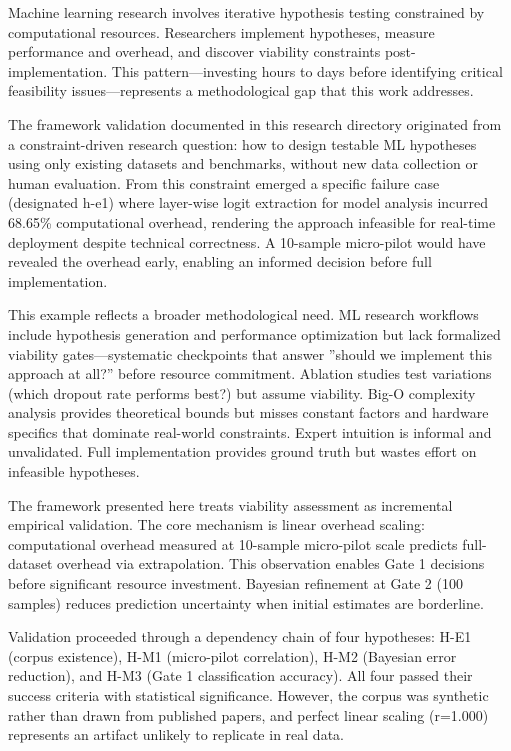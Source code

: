 
Machine learning research involves iterative hypothesis testing constrained by computational resources. Researchers implement hypotheses, measure performance and overhead, and discover viability constraints post-implementation. This pattern---investing hours to days before identifying critical feasibility issues---represents a methodological gap that this work addresses.

The framework validation documented in this research directory originated from a constraint-driven research question: how to design testable ML hypotheses using only existing datasets and benchmarks, without new data collection or human evaluation. From this constraint emerged a specific failure case (designated h-e1) where layer-wise logit extraction for model analysis incurred 68.65\% computational overhead, rendering the approach infeasible for real-time deployment despite technical correctness. A 10-sample micro-pilot would have revealed the overhead early, enabling an informed decision before full implementation.

This example reflects a broader methodological need. ML research workflows include hypothesis generation and performance optimization but lack formalized viability gates---systematic checkpoints that answer ''should we implement this approach at all?'' before resource commitment. Ablation studies test variations (which dropout rate performs best?) but assume viability. Big-O complexity analysis provides theoretical bounds but misses constant factors and hardware specifics that dominate real-world constraints. Expert intuition is informal and unvalidated. Full implementation provides ground truth but wastes effort on infeasible hypotheses.

The framework presented here treats viability assessment as incremental empirical validation. The core mechanism is linear overhead scaling: computational overhead measured at 10-sample micro-pilot scale predicts full-dataset overhead via extrapolation. This observation enables Gate 1 decisions before significant resource investment. Bayesian refinement at Gate 2 (100 samples) reduces prediction uncertainty when initial estimates are borderline.

Validation proceeded through a dependency chain of four hypotheses: H-E1 (corpus existence), H-M1 (micro-pilot correlation), H-M2 (Bayesian error reduction), and H-M3 (Gate 1 classification accuracy). All four passed their success criteria with statistical significance. However, the corpus was synthetic rather than drawn from published papers, and perfect linear scaling (r=1.000) represents an artifact unlikely to replicate in real data.

